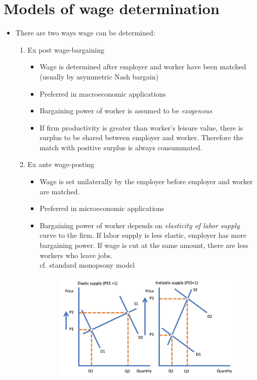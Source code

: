 \documentclass[a4paper, 12pt]{article}
\begin{document}
\section{Models of wage determination}
\begin{itemize}
\item There are two ways wage can be determined:
\begin{enumerate}
\item Ex post wage-bargaining 
\begin{itemize}
\item Wage is determined after employer and worker have been matched (usually by asymmetric Nash bargain)
\item Preferred in macroeconomic applications
\item Bargaining power of worker is assumed to be \emph{exogenous}
\item If firm productivity is greater than worker's leisure value, there is surplus to be shared between employer and worker. Therefore the match with positive surplus is always consummated.
\end{itemize}
\item Ex ante wage-posting
\begin{itemize}
\item Wage is set unilaterally by the employer before employer and worker are matched.
\item Preferred in microeconomic applications
\item Bargaining power of worker depends on \emph{elasticity of labor supply} curve to the firm. If labor supply is less elastic, employer has more bargaining power. If wage is cut at the same amount, there are less workers who leave jobs. \\ cf. standard monopsony model
\begin{figure}[h]
\centering
\includegraphics[scale=0.5]{supply_elasticity.jpg}

\end{figure}
\end{itemize}
\end{enumerate}
\end{itemize}
\end{document}
